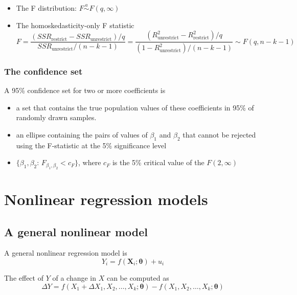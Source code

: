 \documentclass[a4paper,10pt]{article}
\begin{document}
\begin{itemize}
\item The F distribution: \(F \overset{a}{\sim} F(q, \infty)\)

\item The homoskedasticity-only F statistic
\begin{equation}
\label{eq:ftest-hm-r}
F = \frac{(SSR_{\text{restrict}} - SSR_{\text{unrestrict}})/q}{SSR_{\text{unrestrict}}/(n-k-1)} = \frac{(R^2_{\text{unrestrict}} - R^2_{\text{restrict}})/q}{(1 - R^2_{\text{unrestrict}})/(n-k-1)} \sim F(q, n-k-1)
\end{equation}
\end{itemize}

\subsubsection*{The confidence set}
\label{sec:org3e7e432}
A 95\% confidence set for two or more coefficients is 
\begin{itemize}
\item a set that contains the true population values of these coefficients
in 95\% of randomly drawn samples.
\item an ellipse containing the pairs of values of \(\beta_1\) and
\(\beta_2\) that cannot be rejected using the F-statistic at the 5\%
significance level
\item \(\{\beta_1, \beta_2:\, F_{\beta_1,\beta_2} <
  c_F\}\), where \(c_F\) is the 5\% critical value of the \(F(2, \infty)\)
\end{itemize}

\section{Nonlinear regression models}
\label{sec:orgcb0911e}
\subsection{A general nonlinear model}
\label{sec:org0bfa898}
A general nonlinear regression model is 
\begin{equation}
\label{eq:nl-general}
Y_i = f(\mathbf{X}_i; \boldsymbol{\theta}) + u_i
\end{equation}

The effect of \(Y\) of a change in \(X\) can be computed as
\begin{equation}
\label{eq:nl-gen-effect}
\Delta Y = f(X_1 + \Delta X_1, X_2, \ldots, X_k; \boldsymbol{\theta}) - f(X_1, X_2, \ldots, X_k; \boldsymbol{\theta})
\end{equation}
\end{document}
